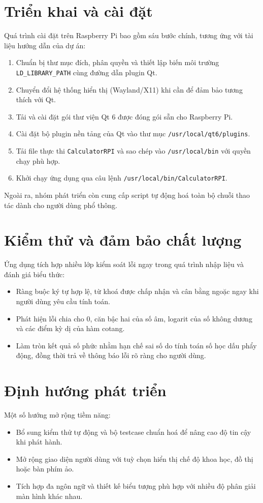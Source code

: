 \documentclass[12pt,a4paper]{article}
\begin{document}
\section{Triển khai và cài đặt}
Quá trình cài đặt trên Raspberry Pi bao gồm sáu bước chính, tương ứng với tài liệu hướng dẫn của dự án:\cite{readme}
\begin{enumerate}[label=\arabic*.]
    \item Chuẩn bị thư mục đích, phân quyền và thiết lập biến môi trường \texttt{LD\_LIBRARY\_PATH} cùng đường dẫn plugin Qt.
    \item Chuyển đổi hệ thống hiển thị (Wayland/X11) khi cần để đảm bảo tương thích với Qt.
    \item Tải và cài đặt gói thư viện Qt 6 được đóng gói sẵn cho Raspberry Pi.
    \item Cài đặt bộ plugin nền tảng của Qt vào thư mục \texttt{/usr/local/qt6/plugins}.
    \item Tải file thực thi \texttt{CalculatorRPI} và sao chép vào \texttt{/usr/local/bin} với quyền chạy phù hợp.
    \item Khởi chạy ứng dụng qua câu lệnh \texttt{/usr/local/bin/CalculatorRPI}.
\end{enumerate}
Ngoài ra, nhóm phát triển còn cung cấp script tự động hoá toàn bộ chuỗi thao tác dành cho người dùng phổ thông.

\section{Kiểm thử và đảm bảo chất lượng}
Ứng dụng tích hợp nhiều lớp kiểm soát lỗi ngay trong quá trình nhập liệu và đánh giá biểu thức:\cite{mainwindow,evaluator}
\begin{itemize}[noitemsep]
    \item Ràng buộc ký tự hợp lệ, từ khoá được chấp nhận và cân bằng ngoặc ngay khi người dùng yêu cầu tính toán.
    \item Phát hiện lỗi chia cho 0, căn bậc hai của số âm, logarit của số không dương và các điểm kỳ dị của hàm cotang.
    \item Làm tròn kết quả số phức nhằm hạn chế sai số do tính toán số học dấu phẩy động, đồng thời trả về thông báo lỗi rõ ràng cho người dùng.
\end{itemize}

\section{Định hướng phát triển}
Một số hướng mở rộng tiềm năng:
\begin{itemize}[noitemsep]
    \item Bổ sung kiểm thử tự động và bộ testcase chuẩn hoá để nâng cao độ tin cậy khi phát hành.
    \item Mở rộng giao diện người dùng với tuỳ chọn hiển thị chế độ khoa học, đồ thị hoặc bàn phím ảo.
    \item Tích hợp đa ngôn ngữ và thiết kế biểu tượng phù hợp với nhiều độ phân giải màn hình khác nhau.
\end{itemize}
\end{document}
